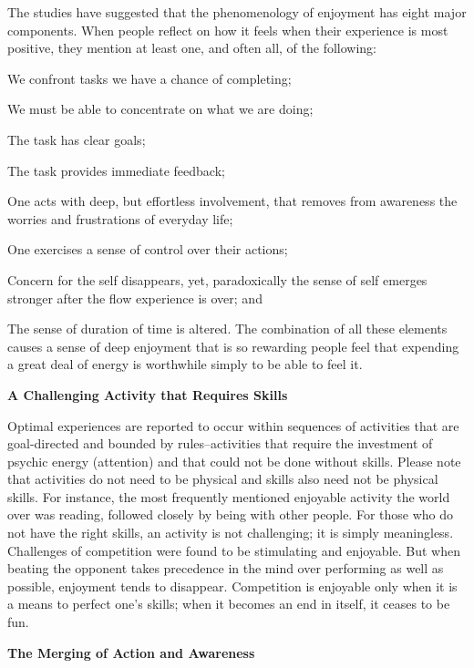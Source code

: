 The studies have suggested that the phenomenology of enjoyment has eight major components. When people reflect on how it feels when their experience is most positive, they mention at least one, and often all, of the following:
\begin{compactitem}
\item We confront tasks we have a chance of completing;
\item We must be able to concentrate on what we are doing; 
\item The task has clear goals;
\item The task provides immediate feedback;
\item One acts with deep, but effortless involvement, that removes from awareness the worries and frustrations
of everyday life;
\item One exercises a sense of control over their actions;
\item Concern for the self disappears, yet, paradoxically
the sense of self emerges stronger after the flow experience is over; and
\item The sense of duration of time is altered.
The combination of all these elements causes a sense of deep enjoyment that is so rewarding people feel that expending a great deal of energy is worthwhile simply to be able to feel it.
\end{compactitem}

\textbf{A Challenging Activity that Requires Skills}

Optimal experiences are reported to occur within sequences of activities that are goal-directed and bounded by rules--activities that require the investment of psychic energy (attention) and that could not be done without skills. Please note that activities do not need to be physical and skills also need not be physical skills. For instance, the most frequently mentioned enjoyable activity the world over was reading, followed closely by being with other people. For those who do not have the right skills, an activity is not challenging; it is simply meaningless. Challenges of competition were found to be stimulating and enjoyable. But when beating the opponent takes precedence in the mind over performing as well as possible, enjoyment tends to disappear. Competition is enjoyable only when it is a means to perfect one's skills; when it becomes an end in itself, it ceases to be fun.


\textbf{The Merging of Action and Awareness}

